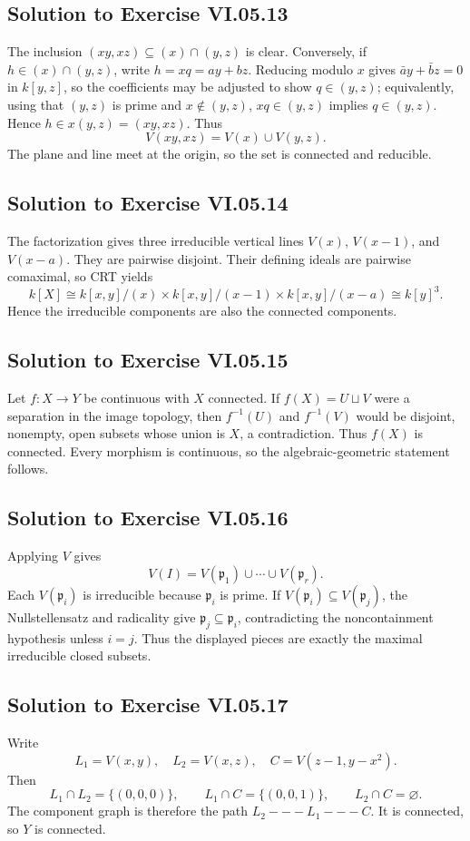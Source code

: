 \subsection*{Solution to Exercise VI.05.13}
The inclusion \((xy,xz)\subseteq(x)\cap(y,z)\) is clear.  Conversely, if
\(h\in(x)\cap(y,z)\), write \(h=xq=ay+bz\).  Reducing modulo \(x\) gives
\(\bar a y+\bar b z=0\) in \(k[y,z]\), so the coefficients may be adjusted to show
\(q\in(y,z)\); equivalently, using that \((y,z)\) is prime and \(x\notin(y,z)\),
\(xq\in(y,z)\) implies \(q\in(y,z)\).  Hence \(h\in x(y,z)=(xy,xz)\).
Thus
\[
V(xy,xz)=V(x)\cup V(y,z).
\]
The plane and line meet at the origin, so the set is connected and reducible.

\subsection*{Solution to Exercise VI.05.14}
The factorization gives three irreducible vertical lines \(V(x)\), \(V(x-1)\), and
\(V(x-a)\).  They are pairwise disjoint.  Their defining ideals are pairwise comaximal,
so CRT yields
\[
k[X]\cong k[x,y]/(x)\times k[x,y]/(x-1)\times k[x,y]/(x-a)
\cong k[y]^3.
\]
Hence the irreducible components are also the connected components.

\subsection*{Solution to Exercise VI.05.15}
Let \(f:X\to Y\) be continuous with \(X\) connected.  If \(f(X)=U\sqcup V\) were a
separation in the image topology, then \(f^{-1}(U)\) and \(f^{-1}(V)\) would be disjoint,
nonempty, open subsets whose union is \(X\), a contradiction.  Thus \(f(X)\) is connected.
Every morphism is continuous, so the algebraic-geometric statement follows.

\subsection*{Solution to Exercise VI.05.16}
Applying \(V\) gives
\[
V(I)=V(\mathfrak p_1)\cup\cdots\cup V(\mathfrak p_r).
\]
Each \(V(\mathfrak p_i)\) is irreducible because \(\mathfrak p_i\) is prime.  If
\(V(\mathfrak p_i)\subseteq V(\mathfrak p_j)\), the Nullstellensatz and radicality give
\(\mathfrak p_j\subseteq\mathfrak p_i\), contradicting the noncontainment hypothesis unless
\(i=j\).  Thus the displayed pieces are exactly the maximal irreducible closed subsets.

\subsection*{Solution to Exercise VI.05.17}
Write
\[
L_1=V(x,y),\quad L_2=V(x,z),\quad C=V(z-1,y-x^2).
\]
Then
\[
L_1\cap L_2=\{(0,0,0)\},\qquad
L_1\cap C=\{(0,0,1)\},\qquad
L_2\cap C=\varnothing.
\]
The component graph is therefore the path \(L_2---L_1---C\).  It is connected, so \(Y\)
is connected.

